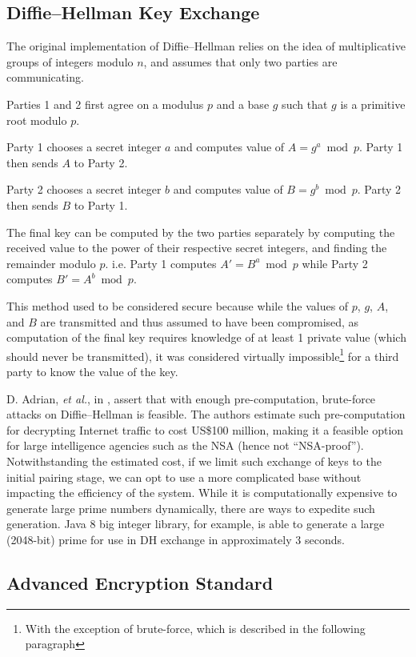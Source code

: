 \documentclass[letterpaper, twocolumn, 10pt, conference]{IEEEtran}
\begin{document}
\subsection{Diffie--Hellman Key Exchange}

The original implementation of Diffie--Hellman \cite{diffie1976new} relies on the idea of multiplicative groups of integers modulo $n$, and assumes that only two parties are communicating.

Parties 1 and 2 first agree on a modulus $p$ and a base $g$ such that $g$ is a primitive root modulo $p$.

Party 1 chooses a secret integer $ a $ and computes value of $ A = g^{a} \bmod{p}$. Party 1 then sends $A$ to Party 2.

Party 2 chooses a secret integer $ b $ and computes value of $ B = g^{b} \bmod{p}$. Party 2 then sends $B$ to Party 1.

The final key can be computed by the two parties separately by computing the received value to the power of their respective secret integers, and finding the remainder modulo $p$. i.e. Party 1 computes $ A' = B^{a} \bmod{p} $ while Party 2 computes $ B' = A^{b} \bmod{p} $.

This method used to be considered secure because while the values of $p$, $g$, $A$, and $B$ are transmitted and thus assumed to have been compromised, as computation of the final key requires knowledge of at least 1 private value (which should never be transmitted), it was considered virtually impossible\footnote{With the exception of brute-force, which is described in the following paragraph} for a third party to know the value of the key.

D. Adrian, \textit{et al.}, in \cite{adrian2015imperfect}, assert that with enough pre-computation, brute-force attacks on Diffie--Hellman is feasible. The authors estimate such pre-computation for decrypting Internet traffic to cost US\$100 million, making it a feasible option for large intelligence agencies such as the NSA (hence not \enquote{NSA-proof}). Notwithstanding the estimated cost, if we limit such exchange of keys to the initial pairing stage, we can opt to use a more complicated base without impacting the efficiency of the system. While it is computationally expensive to generate large prime numbers dynamically, there are ways to expedite such generation. Java 8 big integer library, for example, is able to generate a large (2048-bit) prime for use in DH exchange in approximately 3 seconds.

\subsection{Advanced Encryption Standard}
\end{document}
